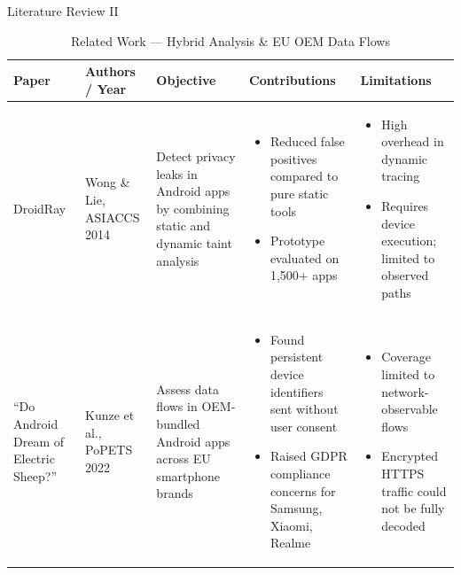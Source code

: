 \documentclass[aspectratio=169]{beamer}
\begin{document}
\begin{frame}{Literature Review II}
\begin{table}[ht]
    \centering
    \caption{Related Work — Hybrid Analysis \& EU OEM Data Flows}
    \tiny
    \begin{tabular}{|p{0.6in}|p{0.65in}|p{1.0in}|p{1.3in}|p{1.3in}|}
    \hline
    \textbf{Paper} & \textbf{Authors / Year} & \textbf{Objective} &
    \textbf{Contributions} & \textbf{Limitations} \\
    \hline
    \vspace{1mm}
    DroidRay &
    Wong \& Lie, ASIACCS 2014 &
    Detect privacy leaks in Android apps by combining static and dynamic taint analysis &
    \begin{itemize}
        \item Reduced false positives compared to pure static tools
        \item Prototype evaluated on 1,500+ apps
    \end{itemize} &
    \begin{itemize}
        \item High overhead in dynamic tracing
        \item Requires device execution; limited to observed paths
    \end{itemize} \\
    \hline
    \vspace{1mm}
    ``Do Android Dream of Electric Sheep?'' &
    Kunze et al., PoPETS 2022 &
    Assess data flows in OEM-bundled Android apps across EU smartphone brands &
    \begin{itemize}
        \item Found persistent device identifiers sent without user consent
        \item Raised GDPR compliance concerns for Samsung, Xiaomi, Realme
    \end{itemize} &
    \begin{itemize}
        \item Coverage limited to network-observable flows
        \item Encrypted HTTPS traffic could not be fully decoded
    \end{itemize} \\
    \hline
    \end{tabular}
\end{table}
\end{frame}
\end{document}
